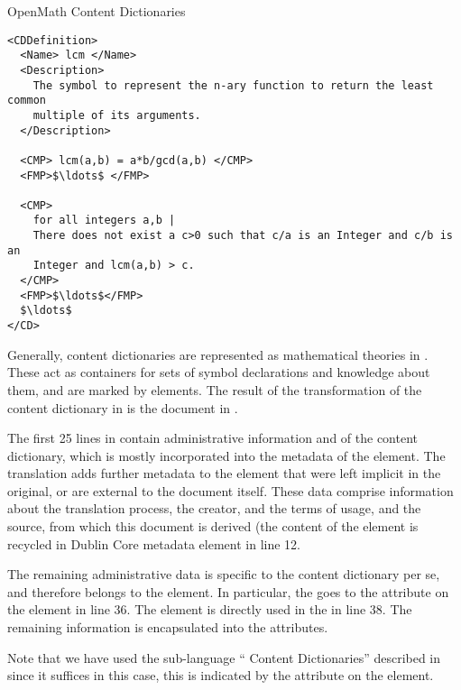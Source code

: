 \begin{tchapter}[id=omcds]{OpenMath Content Dictionaries}
\begin{lstlisting}[language=omCD,label=lst:omcd,mathescape,
    caption={Part of the {\openmath} content dictionary {\snippet{arith1.ocd}}}]
  <CDDefinition>
  <Name> lcm </Name>
  <Description> 
    The symbol to represent the n-ary function to return the least common
    multiple of its arguments.
  </Description>

  <CMP> lcm(a,b) = a*b/gcd(a,b) </CMP>
  <FMP>$\ldots$ </FMP>

  <CMP>
    for all integers a,b |
    There does not exist a c>0 such that c/a is an Integer and c/b is an
    Integer and lcm(a,b) > c.
  </CMP>
  <FMP>$\ldots$</FMP>
  $\ldots$
</CD>
\end{lstlisting}

\noindent Generally, {\openmath} content dictionaries are
represented as mathematical theories in {\omdoc}. These act as
containers for sets of symbol declarations and knowledge about them,
and are marked by {} elements. The result of the
transformation of the content dictionary in {} is the
{\omdoc} document in {}.

The first 25 lines in {} contain administrative information and
{} of the content dictionary, which is mostly incorporated into
the metadata of the {} element. The translation adds further
metadata to the {} element that were left implicit in the original,
or are external to the document itself. These data comprise information about the
translation process, the creator, and the terms of usage, and the source, from
which this document is derived (the content of the {} element is
recycled in Dublin Core metadata element {} in line 12.

The remaining administrative data is specific to the content dictionary per se, and
therefore belongs to the {} element. In particular, the
{} goes to the {} attribute on the
{} element in line 36. The {} element is
directly used in the {} in line 38.  The remaining information is
encapsulated into the {} attributes.

Note that we have used the {\omdoc} sub-language ``{\omdoc} Content Dictionaries''
described in {} since it suffices in this case, this is
indicated by the {} attribute on the {} element.


\end{tchapter}
